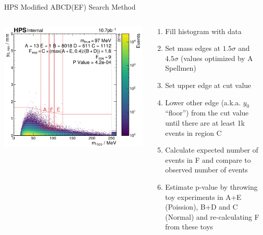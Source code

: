\documentclass[aspectratio=169]{beamer}
\begin{document}
\begin{backup}
\begin{frame}{HPS Modified ABCD(EF) Search Method}
  \begin{columns}
    \begin{column}{0.5\textwidth}
      \centering
      \includegraphics[width=\textwidth]{../figures/hps/analysis/results/search-min-p-val.pdf}
    \end{column}
    \begin{column}{0.5\textwidth}
      \begin{enumerate}
        \item Fill histogram with data
        \item Set mass edges at $1.5\sigma$ and $4.5\sigma$ (values optimized by A Spellmen)
        \item Set upper \minyzero edge at cut value
        \item Lower other \minyzero edge (a.k.a. $y_0$ ``floor'') from the cut value
          until there are at least 1k events in region C
        \item Calculate expected number of events in F
          and compare to observed number of events
        \item Estimate p-value by throwing toy experiments in A+E (Poission), B+D
          and C (Normal) and re-calculating F from these toys
      \end{enumerate}
    \end{column}
  \end{columns}
\end{frame}

\end{backup}
\end{document}
